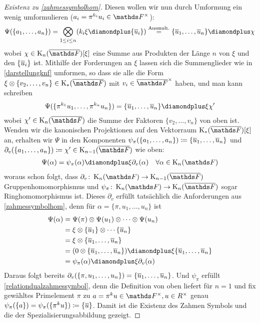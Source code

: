 \documentclass[ngerman,fontsize=11pt, paper=a4, parskip=half, titlepage=true, toc=bib]{scrartcl}
\begin{document}
\begin{proof}[Existenz zu \ref{zahmessymbolhom}]
  Diesen wollen wir nun durch Umformung ein wenig umformulieren
  ($a_i=\pi^{k_i}u_i\in\Fx$):
  \begin{gather*}
    \Psi(\{a_1,\dotsc,a_n\})
    =\bigotimes_{1\leq i\leq n}(k_i\xi\p\{\ov u_i\})
    \overset{\text{Ausmult.}}{=}
    \{\ov u_1,\dotsc,\ov u_n\}\p \chi
  \end{gather*}
  wobei $\chi\in\KnbF[\xi]$ eine Summe aus Produkten der Länge $n$ 
  von $\xi$ und den $\{\overline u_i\}$ ist.
  Mithilfe der Forderungen an $\xi$  lassen sich die Summenglieder 
  wie in \ref{darstellungknf} umformen, so dass sie alle die Form
  $\xi\otimes\{v_2,\dotsc, v_n\}\in\KbF$ mit $v_i\in\bFx$
  haben,
  und man kann schreiben
  \begin{gather*}
    \Psi(\{\pi^{k_1}u_1,\dotsc,\pi^{k_n}u_n\}) 
    = \{\ov u_1,\dotsc,\ov u_n\}\p \xi\chi'
  \end{gather*}
  wobei $\chi'\in\KnbF$ die Summe der Faktoren $\{v_2,\dotsc,v_n\}$
  von oben ist.
  Wenden wir die kanonischen Projektionen auf den Vektorraum 
  $\KbF[\xi]$ an, erhalten wir $\Psi$ in den Komponenten
  $\psi_\pi(\{a_1,\dotsc,a_n\})\coloneqq \{\overline u_1,\dotsc,\overline u_n\}$
  und $\partial_v(\{a_1,\dotsc,a_n\})\coloneqq \chi'\in\K_{n-1}(\bF)$ wie oben:
  \begin{gather*}
    \Psi(\alpha) = \psi_\pi(\alpha)\p \xi\partial_v(\alpha)
    \quad \forall\alpha\in\KnF
  \end{gather*}
  woraus schon folgt, 
  dass $\partial_v\colon\KnF\to\K_{n-1}(\bF)$ Gruppenhomomorphismus 
  und $\psi_\pi\colon\KnF\to\KnbF$ sogar Ringhomomorphismus ist.
  Dieses $\partial_v$ erfüllt tatsächlich die Anforderungen aus 
  \ref{zahmessymbolhom}, denn für $\alpha=\{\pi,u_1,\dotsc, u_n\}$ ist
  \begin{align*}
    \Psi(\alpha)
    &=\Psi(\pi)\otimes\Psi(u_1)\otimes\dotsb\otimes\Psi(u_n)\\
    &=\xi\otimes\{\ov u_1\}\otimes\dotsb\{\ov u_n\}\\
    &=\xi\otimes\{\ov u_1,\dotsc,\ov u_n\}\\
    &=(0\otimes\{\ov u_1,\dotsc,\ov u_n\})
      \p\xi\{\ov u_1,\dotsc,\ov u_n\}\\
    &=\psi_\pi(\alpha) \p \xi\partial_v(\alpha)
  \end{align*}
  Daraus folgt bereits
  $\partial_v(\{\pi,u_1,\dotsc,u_n\})=\{\overline u_1,\dotsc,\overline u_n\}$.  
  Und $\psi_\pi$ erfüllt \ref{relationdualzahmessymbol}, denn 
  die Definition von oben liefert für $n=1$ und fix gewähltes
  Primelement $\pi$ zu $a=\pi^ku\in\Fx, u\in\Rx$ genau
  $\psi_\pi(\{a\})=\psi_\pi(\{\pi^ku\})\coloneqq\{\overline u\}$.
  Damit ist die Existenz des Zahmen Symbols und die der
  Spezialisierungsabbildung gezeigt.
\end{proof}
\end{document}
